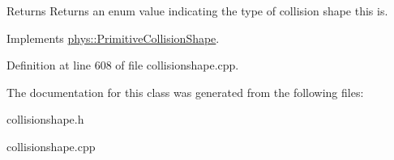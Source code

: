 \begin{DoxyReturn}{Returns}
Returns an enum value indicating the type of collision shape this is. 
\end{DoxyReturn}
 

Implements \hyperlink{classphys_1_1PrimitiveCollisionShape_a16a167ec75ac95aa101b6a9b116e837d}{phys::PrimitiveCollisionShape}.



Definition at line 608 of file collisionshape.cpp.



The documentation for this class was generated from the following files:\begin{DoxyCompactItemize}
\item 
collisionshape.h\item 
collisionshape.cpp\end{DoxyCompactItemize}
